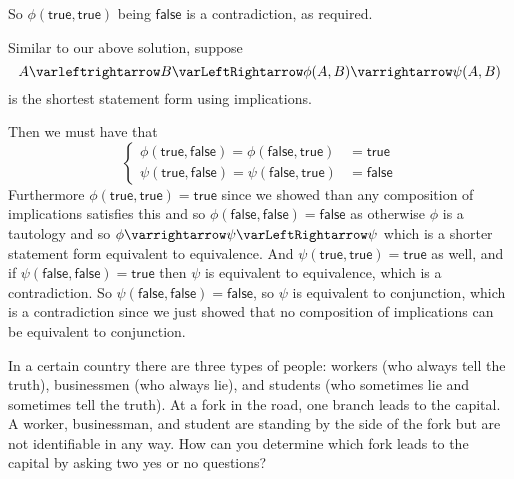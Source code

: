 \documentclass[10pt]{article}
\let\eiff=\varLeftRightarrow
\let\to=\varrightarrow
\let\oto=\varleftrightarrow
\def\true{\mathsf{true}}
\def\false{\mathsf{false}}
\begin{document}
\begin{blankpp}
        So $\phi(\true, \true)$ being $\false$ is a contradiction, as required.

        \item Similar to our above solution, suppose
        \[ A\oto B \eiff \phi(A,B)\to\psi(A,B) \]
        is the shortest statement form using implications.

        Then we must have that
        \[ \left\{\begin{aligned}\phi(\true, \false) = \phi(\false, \true) &= \true \\ \psi(\true, \false) = \psi(\false, \true) &= \false \end{aligned}\right. \]
        Furthermore $\phi(\true,\true)=\true$ since we showed than any composition of implications satisfies this and so $\phi(\false,\false)=\false$ as otherwise $\phi$ is a tautology and so
        $\phi\to\psi\eiff\psi$ which is a shorter statement form equivalent to equivalence.
        And $\psi(\true,\true)=\true$ as well, and if $\psi(\false,\false)=\true$ then $\psi$ is equivalent to equivalence, which is a contradiction.
        So $\psi(\false,\false)=\false$, so $\psi$ is equivalent to conjunction, which is a contradiction since we just showed that no composition of implications can be equivalent to conjunction.
    \eenum

\end{blankpp}

\begin{exercise*}

    In a certain country there are three types of people: workers (who always tell the truth), businessmen (who always lie), and students (who sometimes lie and sometimes tell the truth).
    At a fork in the road, one branch leads to the capital.
    A worker, businessman, and student are standing by the side of the fork but are not identifiable in any way.
    How can you determine which fork leads to the capital by asking two yes or no questions?

\end{exercise*}
\end{document}
